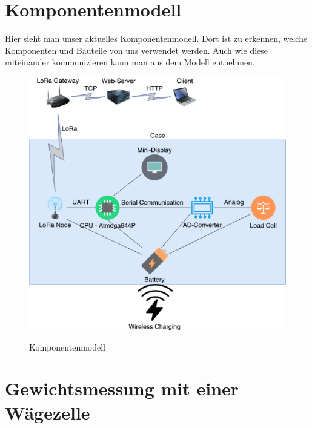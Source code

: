 \chapter{Komponentenmodell}
Hier sieht man unser aktuelles Komponentenmodell. Dort ist zu erkennen, welche Komponenten und Bauteile von uns verwendet werden. Auch wie diese miteinander kommunizieren kann man aus dem Modell entnehmen. 
\begin{figure}[ht]
    \center
    \includegraphics[width=15cm]{Bilder/komponentenmodell.png}\\
    \caption{Komponentenmodell}
    \label{fig:Komponentenmodell}
\end{figure}

\chapter{Gewichtsmessung mit einer Wägezelle}

